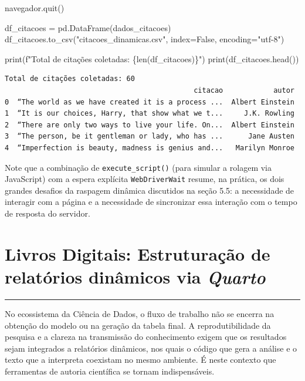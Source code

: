 \documentclass[
  brazilian,
  letterpaper,
  DIV=11,
  numbers=noendperiod]{scrreprt}
\newenvironment{Shaded}{\begin{snugshade}}{\end{snugshade}}
\newcommand{\BuiltInTok}[1]{\textcolor[rgb]{0.00,0.23,0.31}{#1}}
\newcommand{\NormalTok}[1]{\textcolor[rgb]{0.00,0.23,0.31}{#1}}
\newcommand{\OperatorTok}[1]{\textcolor[rgb]{0.37,0.37,0.37}{#1}}
\newcommand{\SpecialCharTok}[1]{\textcolor[rgb]{0.37,0.37,0.37}{#1}}
\newcommand{\SpecialStringTok}[1]{\textcolor[rgb]{0.13,0.47,0.30}{#1}}
\newcommand{\StringTok}[1]{\textcolor[rgb]{0.13,0.47,0.30}{#1}}
\newcommand{\VariableTok}[1]{\textcolor[rgb]{0.07,0.07,0.07}{#1}}
\begin{document}
\begin{Shaded}
\begin{Highlighting}[]
\NormalTok{navegador.quit()}

\NormalTok{df\_citacoes }\OperatorTok{=}\NormalTok{ pd.DataFrame(dados\_citacoes)}
\NormalTok{df\_citacoes.to\_csv(}\StringTok{"citacoes\_dinamicas.csv"}\NormalTok{, index}\OperatorTok{=}\VariableTok{False}\NormalTok{, encoding}\OperatorTok{=}\StringTok{"utf{-}8"}\NormalTok{)}

\BuiltInTok{print}\NormalTok{(}\SpecialStringTok{f"Total de citações coletadas: }\SpecialCharTok{\{}\BuiltInTok{len}\NormalTok{(df\_citacoes)}\SpecialCharTok{\}}\SpecialStringTok{"}\NormalTok{)}
\BuiltInTok{print}\NormalTok{(df\_citacoes.head())}
\end{Highlighting}
\end{Shaded}

\begin{verbatim}
Total de citações coletadas: 60
                                             citacao            autor
0  “The world as we have created it is a process ...  Albert Einstein
1  “It is our choices, Harry, that show what we t...     J.K. Rowling
2  “There are only two ways to live your life. On...  Albert Einstein
3  “The person, be it gentleman or lady, who has ...      Jane Austen
4  “Imperfection is beauty, madness is genius and...   Marilyn Monroe
\end{verbatim}

Note que a combinação de \texttt{execute\_script()} (para simular a
rolagem via JavaScript) com a espera explícita \texttt{WebDriverWait}
resume, na prática, os dois grandes desafios da raspagem dinâmica
discutidos na seção 5.5: a necessidade de interagir com a página e a
necessidade de sincronizar essa interação com o tempo de resposta do
servidor.


\chapter{\texorpdfstring{Livros Digitais: Estruturação de relatórios
dinâmicos via
\emph{Quarto}}{Livros Digitais: Estruturação de relatórios dinâmicos via Quarto}}\label{livros-digitais-estruturauxe7uxe3o-de-relatuxf3rios-dinuxe2micos-via-quarto}

\begin{center}\rule{0.5\linewidth}{0.5pt}\end{center}

No ecossistema da Ciência de Dados, o fluxo de trabalho não se encerra
na obtenção do modelo ou na geração da tabela final. A reprodutibilidade
da pesquisa e a clareza na transmissão do conhecimento exigem que os
resultados sejam integrados a relatórios dinâmicos, nos quais o código
que gera a análise e o texto que a interpreta coexistam no mesmo
ambiente. É neste contexto que ferramentas de autoria científica se
tornam indispensáveis.
\end{document}
